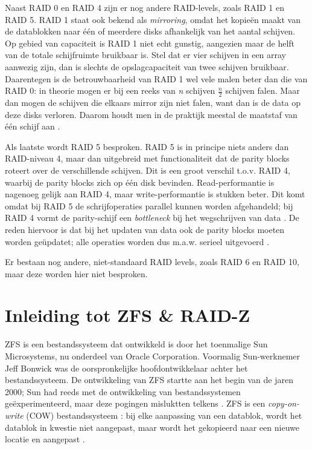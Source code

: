 Naast RAID 0 en RAID 4 zijn er nog andere RAID-levels, zoals RAID 1 en RAID 5. RAID 1 staat ook bekend als \textit{mirroring}, omdat het kopieën maakt van de datablokken naar één of meerdere disks afhankelijk van het aantal schijven. Op gebied van capaciteit is RAID 1 niet echt gunstig, aangezien maar de helft van de totale schijfruimte bruikbaar is. Stel dat er vier schijven in een array aanwezig zijn, dan is slechts de opslagcapaciteit van twee schijven bruikbaar. Daarentegen is de betrouwbaarheid van RAID 1 wel vele malen beter dan die van RAID 0: in theorie mogen er bij een reeks van \textit{n} schijven $\frac{n}{2}$ schijven falen. Maar dan mogen de schijven die elkaars mirror zijn niet falen, want dan is de data op deze disks verloren.  Daarom houdt men in de praktijk meestal de maatstaf van één schijf aan \autocite{OSThreePiecesRemzi2015}.

Als laatste wordt RAID 5 besproken. RAID 5 is in principe niets anders dan RAID-niveau 4, maar dan uitgebreid met functionaliteit dat de parity blocks roteert over de verschillende schijven. Dit is een groot verschil t.o.v. RAID 4, waarbij de parity blocks zich op één disk bevinden. Read-performantie is nagenoeg gelijk aan RAID 4, maar write-performantie is stukken beter. Dit komt omdat bij RAID 5 de schrijfoperaties parallel kunnen worden afgehandeld; bij RAID 4 vormt de parity-schijf een \textit{bottleneck} bij het wegschrijven van data \autocite{Chen1994}. De reden hiervoor is dat bij het updaten van data ook de parity blocks moeten worden geüpdatet; alle operaties worden dus m.a.w. serieel uitgevoerd \autocite{OSThreePiecesRemzi2015}.

Er bestaan nog andere, niet-standaard RAID levels, zoals RAID 6 en RAID 10, maar deze worden hier niet besproken.

\section{Inleiding tot ZFS \& RAID-Z}

ZFS is een bestandssysteem dat ontwikkeld is door het toenmalige Sun Microsystems, nu onderdeel van Oracle Corporation. Voormalig Sun-werknemer Jeff Bonwick was de oorspronkelijke hoofdontwikkelaar achter het bestandssysteem. De ontwikkeling van ZFS startte aan het begin van de jaren 2000; Sun had reeds met de ontwikkeling van bestandssystemen geëxperimenteerd, maar deze pogingen misluktten telkens \autocite{Bonwick2015}. ZFS is een \textit{copy-on-write} (COW) bestandssysteem \autocite{BrianHickmann2007}: bij elke aanpassing van een datablok, wordt het datablok in kwestie niet aangepast, maar wordt het gekopieerd naar een nieuwe locatie en aangepast \autocite{Lucas2015}.

